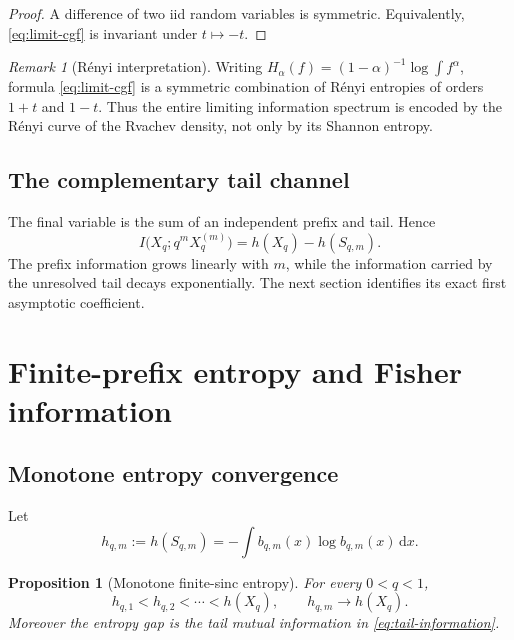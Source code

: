 \documentclass[11pt,oneside]{article}
\newtheorem{proposition}[theorem]{Proposition}
\theoremstyle{definition}
\theoremstyle{remark}
\newtheorem{remark}[theorem]{Remark}
\newcommand{\dd}{\,\mathrm d}
\begin{document}
\begin{proof}
A difference of two iid random variables is symmetric.  Equivalently,
\eqref{eq:limit-cgf} is invariant under $t\mapsto-t$.
\end{proof}

\begin{remark}[R\'enyi interpretation]
Writing $H_\alpha(f)=(1-\alpha)^{-1}\log\int f^\alpha$, formula
\eqref{eq:limit-cgf} is a symmetric combination of R\'enyi entropies of orders
$1+t$ and $1-t$.  Thus the entire limiting information spectrum is encoded by the
R\'enyi curve of the Rvachev density, not only by its Shannon entropy.
\end{remark}

\subsection{The complementary tail channel}

The final variable is the sum of an independent prefix and tail.  Hence
\begin{equation}
 I\bigl(X_q;q^mX_q^{(m)}\bigr)
 =h(X_q)-h(S_{q,m}).
 \label{eq:tail-information}
\end{equation}
The prefix information grows linearly with $m$, while the information carried by
the unresolved tail decays exponentially.  The next section identifies its exact
first asymptotic coefficient.

\section{Finite-prefix entropy and Fisher information}
\label{sec:fisher-prefix}

\subsection{Monotone entropy convergence}

Let
\begin{equation}
 h_{q,m}:=h(S_{q,m})=-\int b_{q,m}(x)\log b_{q,m}(x)\dd x.
 \label{eq:prefix-entropy}
\end{equation}

\begin{proposition}[Monotone finite-sinc entropy]
\label{prop:entropy-monotone}
For every $0<q<1$,
\begin{equation}
 h_{q,1}<h_{q,2}<\cdots<h(X_q),
 \qquad
 h_{q,m}\longrightarrow h(X_q).
 \label{eq:entropy-monotone}
\end{equation}
Moreover the entropy gap is the tail mutual information in
\eqref{eq:tail-information}.
\end{proposition}
\end{document}
